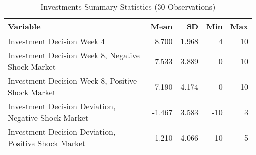 \begin{table}[ht]
\centering
\caption{Investments Summary Statistics (30 Observations)} 
\label{table:InvestmentsSummaryStats}
\begin{tabularx}{\textwidth}{Xrrrr}
  \toprule
Variable & Mean & SD & Min & Max \\ 
  \midrule
Investment Decision Week 4 & 8.700 & 1.968 & 4 & 10 \\ 
  Investment Decision Week 8, Negative Shock Market & 7.533 & 3.889 & 0 & 10 \\ 
  Investment Decision Week 8, Positive Shock Market & 7.190 & 4.174 & 0 & 10 \\ 
  Investment Decision Deviation, Negative Shock Market & -1.467 & 3.583 & -10 & 3 \\ 
  Investment Decision Deviation, Positive Shock Market & -1.210 & 4.066 & -10 & 5 \\ 
   \bottomrule
\end{tabularx}
\end{table}
